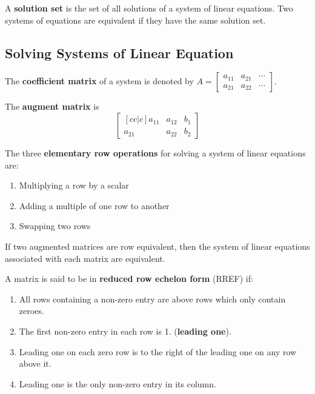 \documentclass[english, 12pt]{article}
\begin{document}
\begin{defn}
A \textbf{solution set} is the set of all solutions of a system of linear equations. Two systems of equations are equivalent if they have the same solution set.
\end{defn}

\subsection{Solving Systems of Linear Equation}

\begin{defn}
The \textbf{coefficient matrix} of a system is denoted by $A = \begin{bmatrix} a_{11}  & a_{21} & \cdots \\ a_{21} & a_{22} & \cdots \end{bmatrix}$.
\end{defn}

\begin{defn}
The \textbf{augment matrix} is
\[
\begin{bmatrix}[cc|c]
  a_{11} & a_{12} & b_{1}\\
  a_{21} & a_{22} & b_{2}
\end{bmatrix}
\]
\end{defn}

\begin{mthd}
The three \textbf{elementary row operations} for solving a system of linear equations are:
\begin{enumerate}
\item Multiplying a row by a scalar
\item Adding a multiple of one row to another
\item Swapping two rows
\end{enumerate}
\end{mthd}

\begin{thrm}
If two augmented matrices are row equivalent, then the system of linear equations associated with each matrix are equivalent.
\end{thrm}

\begin{defn}
A matrix is said to be in \textbf{reduced row echelon form} (RREF) if:
\begin{enumerate}
  \item All rows containing a non-zero entry are above rows which only contain zeroes.
  \item The first non-zero entry in each row is 1. (\textbf{leading one}).
  \item Leading one on each zero row is to the right of the leading one on any row above it.
  \item Leading one is the only non-zero entry in its column.
\end{enumerate}
\end{defn}
\end{document}

